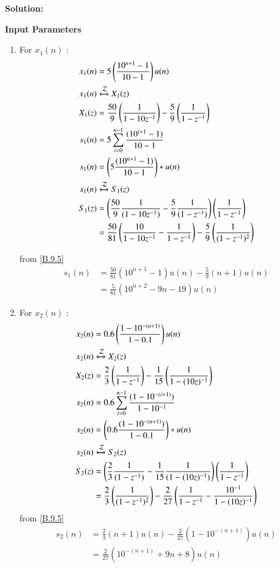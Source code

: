 \documentclass[journal,12pt,twocolumn]{IEEEtran}
\theoremstyle{remark}
\begin{document}
\textbf{Solution:}
\begin{table}[h!]
    \centering
    
    \caption{\textbf{Input Parameters}}
    \label{tab:table_sr5}
\end{table} 
\begin{enumerate}
\item For $x_1(n)$ :
\begin{align}
x_1(n) &= 5\left(\frac{10^{n+1}-1}{10-1}\right)u(n)\\
x_1(n) & \xleftrightarrow{\mathcal{Z}} X_1(z)\\
X_1(z) &= \frac{50}{9}\left(\frac{1}{1-10z^{-1}}\right)-\frac{5}{9}\left(\frac{1}{1-z^{-1}}\right)\\
s_1(n) &= 5  \sum_{i=0}^{n-1} \frac{(10^{i+1} -1)}{10-1}\\
s_1(n) &= \left(5\frac{(10^{n+1}-1)}{10-1}\right)*u(n)\\
s_1(n) & \xleftrightarrow{\mathcal{Z}} S_1(z)\\
S_1(z) &= \left(\frac{50}{9}\frac{1}{(1-10z^{-1})}-\frac{5}{9}\frac{1}{(1-z^{-1})}\right)\left(\frac{1}{1-z^{-1}}\right)\\
       &=\frac{50}{81}\left(\frac{10}{1-10z^{-1}}-\frac{1}{1-z^{-1}}\right)-\frac{5}{9}\left(\frac{1}{(1-z^{-1})^2}\right)
\end{align}

from \eqref{B.9.5}
\begin{align}
s_1(n) &=\frac{50}{81}(10^{n+1}-1)u(n)-\frac{5}{9}(n+1)u(n)\\
       &=\frac{5}{81}(10^{n+2}-9n-19)u(n)       
\end{align}
\item For $x_2(n)$ :
\begin{align}
x_2(n) &= 0.6 \left(\frac{1-10^{-(n+1)}}{1-0.1}\right)u(n)\\
x_2(n) & \xleftrightarrow{\mathcal{Z}} X_2(z)\\
X_2(z) &= \frac{2}{3}\left(\frac{1}{1-z^{-1}}\right)-\frac{1}{15}\left(\frac{1}{1-(10z)^{-1}}\right)\\
s_2(n) &= 0.6 \sum_{i=0}^{n-1} \frac{(1-10^{-(i+1)})}{1-10^{-1}}\\
s_2(n) &= \left(0.6 \frac{(1-10^{-(n+1)})}{1-0.1}\right)*u(n)\\
s_2(n) & \xleftrightarrow{\mathcal{Z}} S_2(z)\\
S_2(z) &= \left(\frac{2}{3}\frac{1}{(1-z^{-1})}-\frac{1}{15}\frac{1}{(1-(10z)^{-1})}\right)\left(\frac{1}{1-z^{-1}}\right)\\
   &=\frac{2}{3}\left(\frac{1}{(1-z^{-1})^2}\right)-\frac{2}{27}\left(\frac{1}{1-z^{-1}}-\frac{10^{-1}}{1-(10z)^{-1}}\right)
 \end{align}
   from \eqref{B.9.5}
\begin{align}
s_2(n) &=\frac{2}{3}(n+1)u(n)-\frac{2}{27}(1-10^{-(n+1)})u(n)\\
       &= \frac{2}{27}(10^{-(n+1)}+9n+8)u(n)
\end{align}
\end{enumerate}
\end{document}
